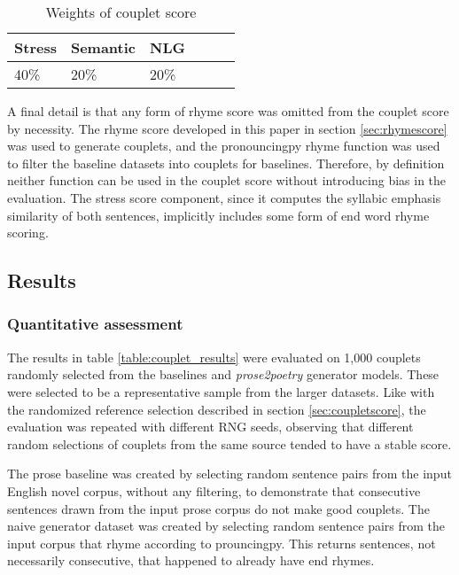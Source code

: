 \documentclass[11pt,a4paper]{article}
\begin{document}
\begin{table}[ht]
\centering
\begin{tabular}{lll c c c}
	\hline\hline
	Stress & Semantic & NLG \\ [0.5ex]
	\hline
	40\% & 20\% & 20\% \\ [0.5ex]
	\hline
\end{tabular}
\caption{Weights of couplet score}
\label{table:weight_couplet_score}
\end{table}

A final detail is that any form of rhyme score was omitted from the couplet score by necessity. The rhyme score developed in this paper in section \ref{sec:rhymescore} was used to generate couplets, and the pronouncingpy rhyme function was used to filter the baseline datasets into couplets for baselines. Therefore, by definition neither function can be used in the couplet score without introducing bias in the evaluation. The stress score component, since it computes the syllabic emphasis similarity of both sentences, implicitly includes some form of end word rhyme scoring.

\subsection{Results}
\label{sec:results}
\subsubsection{Quantitative assessment}

The results in table \ref{table:couplet_results} were evaluated on 1,000 couplets randomly selected from the baselines and \textit{prose2poetry} generator models. These were selected to be a representative sample from the larger datasets. Like with the randomized reference selection described in section \ref{sec:coupletscore}, the evaluation was repeated with different RNG seeds, observing that different random selections of couplets from the same source tended to have a stable score.

The prose baseline was created by selecting random sentence pairs from the input English novel corpus, without any filtering, to demonstrate that consecutive sentences drawn from the input prose corpus do not make good couplets. The naive generator dataset was created by selecting random sentence pairs from the input corpus that rhyme according to prouncingpy. This returns sentences, not necessarily consecutive, that happened to already have end rhymes.
\end{document}
